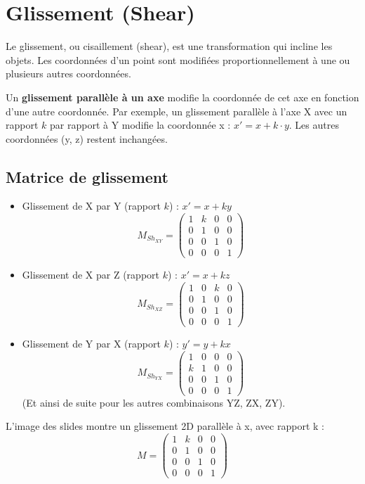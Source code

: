 \section{Glissement (Shear)}
Le glissement, ou cisaillement (shear), est une transformation qui incline les objets. Les coordonnées d'un point sont modifiées proportionnellement à une ou plusieurs autres coordonnées.
\begin{definition}
Un \textbf{glissement parallèle à un axe} modifie la coordonnée de cet axe en fonction d'une autre coordonnée. Par exemple, un glissement parallèle à l'axe X avec un rapport \( k \) par rapport à Y modifie la coordonnée x : \( x' = x + k \cdot y \). Les autres coordonnées (y, z) restent inchangées.
\end{definition}
\subsection{Matrice de glissement}
\begin{itemize}
    \item Glissement de X par Y (rapport \( k \)) : \( x' = x + k y \)
    \[ M_{Sh_{XY}} = \begin{pmatrix} 1 & k & 0 & 0 \\ 0 & 1 & 0 & 0 \\ 0 & 0 & 1 & 0 \\ 0 & 0 & 0 & 1 \end{pmatrix} \]
    \item Glissement de X par Z (rapport \( k \)) : \( x' = x + k z \)
    \[ M_{Sh_{XZ}} = \begin{pmatrix} 1 & 0 & k & 0 \\ 0 & 1 & 0 & 0 \\ 0 & 0 & 1 & 0 \\ 0 & 0 & 0 & 1 \end{pmatrix} \]
    \item Glissement de Y par X (rapport \( k \)) : \( y' = y + k x \)
    \[ M_{Sh_{YX}} = \begin{pmatrix} 1 & 0 & 0 & 0 \\ k & 1 & 0 & 0 \\ 0 & 0 & 1 & 0 \\ 0 & 0 & 0 & 1 \end{pmatrix} \]
    (Et ainsi de suite pour les autres combinaisons YZ, ZX, ZY).
\end{itemize}
L'image des slides montre un glissement 2D parallèle à x, avec rapport k :
\[ M = \begin{pmatrix} 1 & k & 0 & 0 \\ 0 & 1 & 0 & 0 \\ 0 & 0 & 1 & 0 \\ 0 & 0 & 0 & 1 \end{pmatrix} \]
